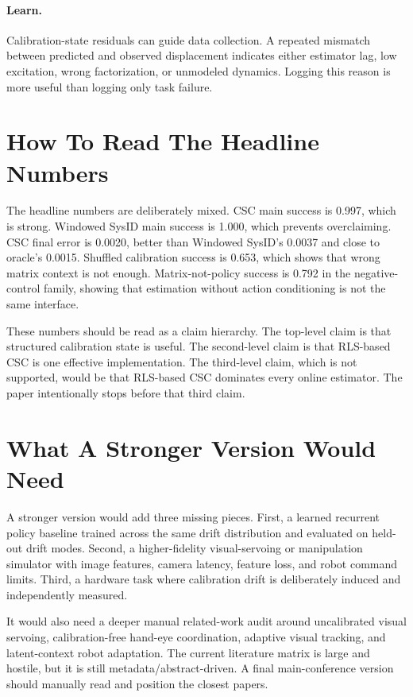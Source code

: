 \documentclass{article}
\begin{document}
\paragraph{Learn.}
Calibration-state residuals can guide data collection. A repeated mismatch
between predicted and observed displacement indicates either estimator lag, low
excitation, wrong factorization, or unmodeled dynamics. Logging this reason is
more useful than logging only task failure.

\section{How To Read The Headline Numbers}

The headline numbers are deliberately mixed. CSC main success is 0.997, which
is strong. Windowed SysID main success is 1.000, which prevents overclaiming.
CSC final error is 0.0020, better than Windowed SysID's 0.0037 and close to
oracle's 0.0015. Shuffled calibration success is 0.653, which shows that wrong
matrix context is not enough. Matrix-not-policy success is 0.792 in the
negative-control family, showing that estimation without action conditioning is
not the same interface.

These numbers should be read as a claim hierarchy. The top-level claim is that
structured calibration state is useful. The second-level claim is that
RLS-based CSC is one effective implementation. The third-level claim, which is
not supported, would be that RLS-based CSC dominates every online estimator.
The paper intentionally stops before that third claim.

\section{What A Stronger Version Would Need}

A stronger version would add three missing pieces. First, a learned recurrent
policy baseline trained across the same drift distribution and evaluated on
held-out drift modes. Second, a higher-fidelity visual-servoing or manipulation
simulator with image features, camera latency, feature loss, and robot command
limits. Third, a hardware task where calibration drift is deliberately induced
and independently measured.

It would also need a deeper manual related-work audit around uncalibrated
visual servoing, calibration-free hand-eye coordination, adaptive visual
tracking, and latent-context robot adaptation. The current literature matrix is
large and hostile, but it is still metadata/abstract-driven. A final
main-conference version should manually read and position the closest papers.
\end{document}
